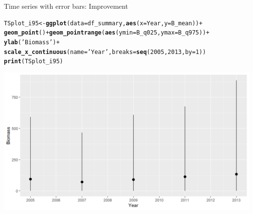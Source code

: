 \documentclass{beamer}\usepackage[]{graphicx}\usepackage[]{color}
\makeatletter
\newcommand{\hlnum}[1]{\textcolor[rgb]{0.686,0.059,0.569}{#1}}%
\newcommand{\hlstr}[1]{\textcolor[rgb]{0.192,0.494,0.8}{#1}}%
\newcommand{\hlopt}[1]{\textcolor[rgb]{0,0,0}{#1}}%
\newcommand{\hlstd}[1]{\textcolor[rgb]{0.345,0.345,0.345}{#1}}%
\newcommand{\hlkwb}[1]{\textcolor[rgb]{0.69,0.353,0.396}{#1}}%
\newcommand{\hlkwc}[1]{\textcolor[rgb]{0.333,0.667,0.333}{#1}}%
\newcommand{\hlkwd}[1]{\textcolor[rgb]{0.737,0.353,0.396}{\textbf{#1}}}%
\newenvironment{kframe}{%
 \def\at@end@of@kframe{}%
 \ifinner\ifhmode%
  \def\at@end@of@kframe{\end{minipage}}%
  \begin{minipage}{\columnwidth}%
 \fi\fi%
 \def\FrameCommand##1{\hskip\@totalleftmargin \hskip-\fboxsep
 \colorbox{shadecolor}{##1}\hskip-\fboxsep
     \hskip-\linewidth \hskip-\@totalleftmargin \hskip\columnwidth}%
 \MakeFramed {\advance\hsize-\width
   \@totalleftmargin\z@ \linewidth\hsize
   \@setminipage}}%
 {\par\unskip\endMakeFramed%
 \at@end@of@kframe}
\newenvironment{knitrout}{}{} %
\makeatother
\begin{document}
\begin{frame}[fragile]{Time series with error bars: Improvement}
\begin{knitrout}\footnotesize
{}\color{fgcolor}\begin{kframe}
\begin{alltt}
\hlstd{TSplot_i95} \hlkwb{<-} \hlkwd{ggplot}\hlstd{(}\hlkwc{data}\hlstd{=df_summary,} \hlkwd{aes}\hlstd{(}\hlkwc{x}\hlstd{=Year,} \hlkwc{y}\hlstd{=B_mean))} \hlopt{+}
  \hlkwd{geom_point}\hlstd{()} \hlopt{+} \hlkwd{geom_pointrange}\hlstd{(}\hlkwd{aes}\hlstd{(}\hlkwc{ymin} \hlstd{= B_q025,} \hlkwc{ymax} \hlstd{= B_q975))} \hlopt{+}
  \hlkwd{ylab}\hlstd{(}\hlstr{'Biomass'}\hlstd{)} \hlopt{+}
  \hlkwd{scale_x_continuous}\hlstd{(}\hlkwc{name} \hlstd{=} \hlstr{'Year'}\hlstd{,} \hlkwc{breaks} \hlstd{=} \hlkwd{seq}\hlstd{(}\hlnum{2005}\hlstd{,} \hlnum{2013}\hlstd{,} \hlkwc{by} \hlstd{=} \hlnum{1}\hlstd{))}
\hlkwd{print}\hlstd{(TSplot_i95)}
\end{alltt}
\end{kframe}

{\centering \includegraphics[width=.9\linewidth]{figure/sp_TSplot_i95_imp-1} 

}



\end{knitrout}
\end{frame}
\end{document}
